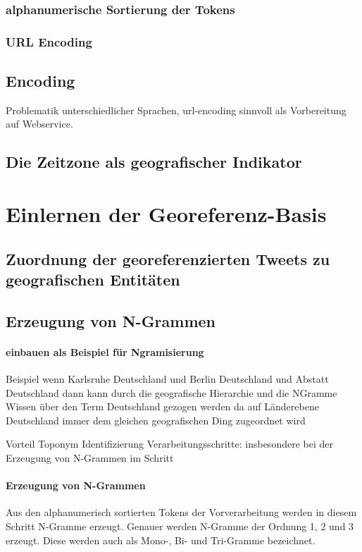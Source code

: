 		  	\subsubsection{alphanumerische Sortierung der Tokens}

		  	\subsubsection{URL Encoding}
		  		\subsection{Encoding}
				Problematik unterschiedlicher Sprachen, 
				url-encoding sinnvoll als Vorbereitung auf Webservice. 

		  	

		\subsection{Die Zeitzone als geografischer Indikator}     

	\section{Einlernen der Georeferenz-Basis}

		\subsection{Zuordnung der georeferenzierten Tweets zu geografischen Entitäten} 

		\subsection{Erzeugung von N-Grammen}

				\paragraph{einbauen als Beispiel für Ngramisierung} 
				Beispiel wenn Karlsruhe Deutschland und Berlin Deutschland und Abstatt Deutschland dann kann durch die geografische Hierarchie und die NGramme Wissen über den Term Deutschland gezogen werden da auf Länderebene Deutschland immer dem gleichen geografischen Ding zugeordnet wird 

				Vorteil Toponym Identifizierung Verarbeitungsschritte:  insbesondere bei der Erzeugung von N-Grammen im Schritt 

		  		\paragraph{Erzeugung von N-Grammen}
			  	Aus den alphanumerisch sortierten Tokens der Vorverarbeitung werden in diesem Schritt N-Gramme erzeugt.
			  	Genauer werden N-Gramme der Ordnung 1, 2 und 3 erzeugt.
			  	Diese werden auch als Mono-, Bi- und Tri-Gramme bezeichnet.  

